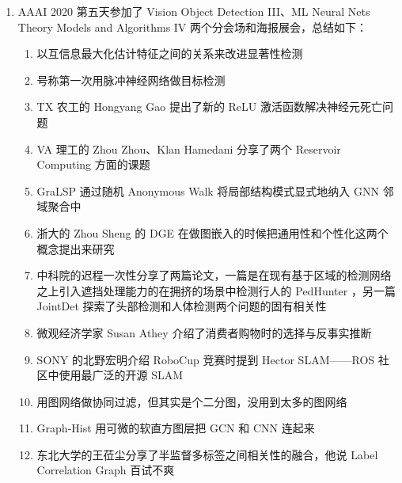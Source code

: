 \documentclass[11pt]{article}
\begin{document}
\begin{enumerate}
\item AAAI 2020 第五天参加了 Vision Object Detection III、ML Neural Nets Theory Models and Algorithms IV 两个分会场和海报展会，总结如下：
\begin{enumerate}
\item \cite{0e49f574cae742398e600b1ce7eb36a4} 以互信息最大化估计特征之间的关系来改进显著性检测
\item \cite{kim2019spiking} 号称第一次用脉冲神经网络做目标检测
\item TX 农工的 Hongyang Gao 提出了新的 ReLU 激活函数解决神经元死亡问题
\item VA 理工的 Zhou Zhou、Klan Hamedani 分享了两个 Reservoir Computing 方面的课题
\item GraLSP \cite{jin2019gralsp} 通过随机 Anonymous Walk 将局部结构模式显式地纳入 GNN 邻域聚合中
\item 浙大的 Zhou Sheng 的 DGE 在做图嵌入的时候把通用性和个性化这两个概念提出来研究
\item 中科院的迟程一次性分享了两篇论文，一篇是在现有基于区域的检测网络之上引入遮挡处理能力的在拥挤的场景中检测行人的 PedHunter \cite{chi2019pedhunter} ，另一篇 JointDet \cite{chi2019relational} 探索了头部检测和人体检测两个问题的固有相关性 
\item 微观经济学家 Susan Athey 介绍了消费者购物时的选择与反事实推断
\item SONY 的北野宏明介绍 RoboCup 竞赛时提到 Hector SLAM——ROS 社区中使用最广泛的开源 SLAM
\item \cite{wang2019multi} 用图网络做协同过滤，但其实是个二分图，没用到太多的图网络
\item Graph-Hist \cite{magelinski2019graph} 用可微的软直方图层把 GCN 和 CNN 连起来
\item 东北大学的王莅尘分享了半监督多标签之间相关性的融合，他说 Label Correlation Graph 百试不爽
\end{enumerate}


\end{enumerate}
\end{document}
